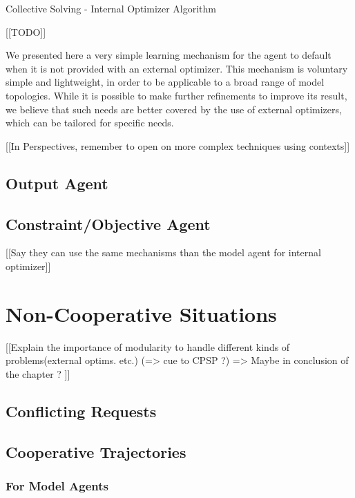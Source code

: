 \begin{algorithm}
\caption{Collective Solving - Internal Optimizer Algorithm}
\label{algo_solving_internaloptim}
	[[TODO]]\;
\end{algorithm}

We presented here a very simple learning mechanism for the agent to default when it is not provided with an external optimizer. This mechanism is voluntary simple and lightweight, in order to be applicable to a broad range of model topologies. While it is possible to make further refinements to improve its result, we believe that such needs are better covered by the use of external optimizers, which can be tailored for specific needs.

[[In Perspectives, remember to open on more complex techniques using contexts]]

\subsection{Output Agent}

\subsection{Constraint/Objective Agent}

[[Say they can use the same mechanisms than the model agent for internal optimizer]]

\section{Non-Cooperative Situations}

[[Explain the importance of modularity to handle different kinds of problems(external optims. etc.)
(=> cue to CPSP ?)
=> Maybe in conclusion of the chapter ?
]]

\subsection{Conflicting Requests}

\subsection{Cooperative Trajectories}

\subsubsection{For Model Agents}

